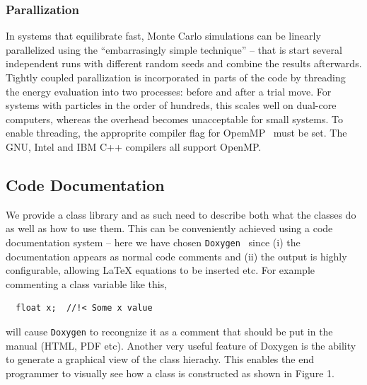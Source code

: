 \documentclass[10pt]{bmc_article}
\newenvironment{bmcformat}{\fussy\setboolean{publ}{true}}{\fussy}
\begin{document}
\begin{bmcformat}
\subsubsection*{Parallization}
In systems that equilibrate fast, Monte Carlo simulations can be linearly parallelized using the ``embarrasingly simple technique'' -- that is start several independent runs with different random seeds and combine the results afterwards.
Tightly coupled parallization is incorporated in parts of the code by threading the energy evaluation into two processes: before and after a trial move.
For systems with particles in the order of hundreds, this scales well on dual-core computers, whereas the overhead becomes unacceptable for small systems. To enable threading, the approprite compiler flag for OpemMP~\cite{openmp:98} must be set. The GNU, Intel and IBM C++ compilers all support OpenMP.

\subsection*{Code Documentation}
We provide a class library and as such need to describe both what the classes do as well as how to use them. This can be conveniently achieved using a code documentation system -- here we have chosen \verb"Doxygen"~\cite{doxygen} since (i) the documentation appears as normal code comments and (ii) the output is highly configurable, allowing LaTeX equations to be inserted etc.
For example commenting a class variable like this,
\begin{verbatim}
  float x;  //!< Some x value
\end{verbatim}
will cause \verb"Doxygen" to recongnize it as a comment that should be put in the manual (HTML, PDF etc). Another very useful feature of Doxygen is the ability to generate a graphical view of the class hierachy. This enables the end programmer to visually see how a class is constructed as shown in Figure 1.



\end{bmcformat}
\end{document}
